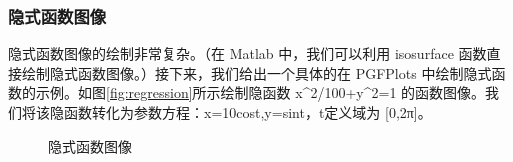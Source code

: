 \subsubsection{隐式函数图像}
隐式函数图像的绘制非常复杂。（在 Matlab 中，我们可以利用 isosurface 函数直接绘制隐式函数图像。）接下来，我们给出一个具体的在 PGFPlots 中绘制隐式函数的示例。如图\ref{fig:regression}所示绘制隐函数 x\^{}2/100+y\^{}2=1 的函数图像。我们将该隐函数转化为参数方程：x=10cost,y=sint，t定义域为 [0,2π]。

\begin{figure}[htb]
	\centering
	\caption{隐式函数图像}
	\label{fig:hide}
\end{figure}

